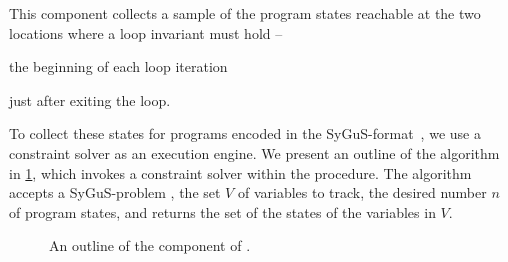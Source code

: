 \documentclass[conference]{IEEEtran}
\begin{document}
\noindent
This component collects a sample of the program states reachable at the two locations where a loop invariant must hold --
\begin{andlist}
    \item the beginning of each loop iteration
    \item just after exiting the loop.
\end{andlist}
To collect these states for programs encoded in the SyGuS-\INV format~\citep{Alur2016SyGuSComp2R},
we use a constraint solver as an execution engine.
We present an outline of the \Record algorithm in \cref{algo:record},
which invokes a constraint solver within the \GetModel procedure.
The algorithm accepts a SyGuS-\INV problem \SyGuSINVQuadruplet,
the set $V$ of variables to track, the desired number $n$ of program states,
and returns the set \States of the states of the variables in $V$.




\begin{figure}[!t]
      \caption{An outline of the \Record component of \LoopInvGen.}
    \label{algo:record}
\end{figure}
\end{document}
